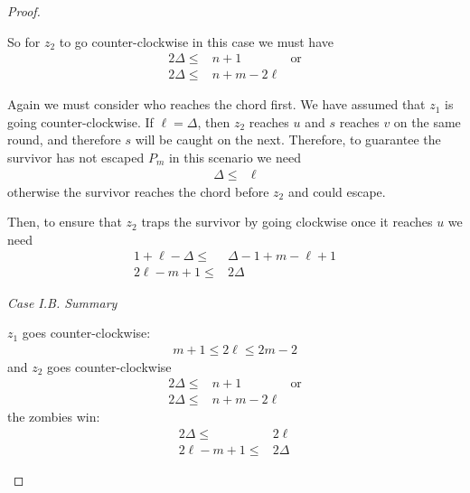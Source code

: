 \begin{proof}
\begin{proofpart}
  So for $z_2$ to go counter-clockwise in this case we must have
  \begin{align*}
   2 \Delta \leq & n + 1         & \text{or} \\
   2 \Delta \leq & n + m - 2\ell
  \end{align*}

  Again we must consider who reaches the chord first. We have assumed that $z_1$ is going counter-clockwise. If $\ell = \Delta$, then $z_2$ reaches $u$ and $s$ reaches $v$ on the same round, and therefore $s$ will be caught on the next. Therefore, to guarantee the survivor has not escaped $P_m$ in this scenario we need
  \begin{align*}
   \Delta \leq & \ell
  \end{align*}
  otherwise the survivor reaches the chord before $z_2$ and
  could escape.

  Then, to ensure that $z_2$ traps the survivor by going clockwise once
  it reaches $u$ we need
  \begin{align*}
   1 + \ell - \Delta \leq & \Delta -1 + m - \ell + 1 \\
   2\ell - m + 1 \leq     & 2 \Delta
  \end{align*}

  \textit{Case I.B. Summary}

  $z_1$ goes counter-clockwise:
  \begin{align*}
   m + 1 \leq 2 \ell \leq 2m - 2
  \end{align*}
  and $z_2$ goes counter-clockwise
  \begin{align*}
   2 \Delta \leq & n + 1         & \text{or} \\
   2 \Delta \leq & n + m - 2\ell
  \end{align*}
  the zombies win:
  \begin{align*}
   2 \Delta \leq      & 2 \ell   \\
   2\ell - m + 1 \leq & 2 \Delta
  \end{align*}


\end{proofpart}
\end{proof}
